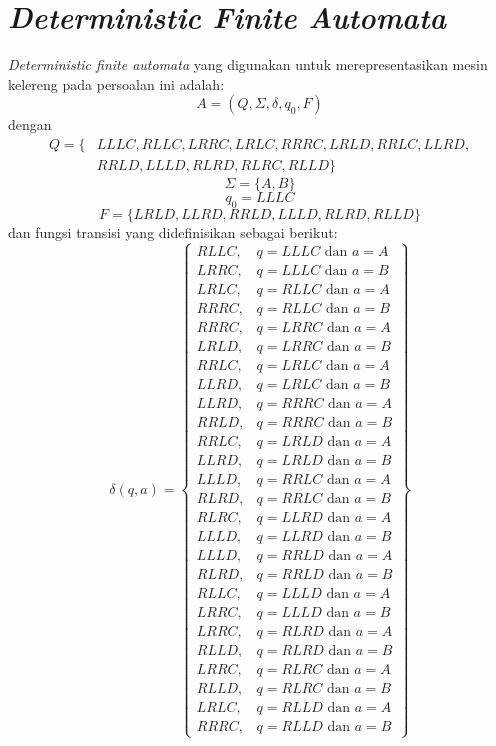 \documentclass[a4paper,titlepage]{article}
\begin{document}
	\section{\textit{Deterministic Finite Automata}}

		\textit{Deterministic finite automata} yang digunakan untuk merepresentasikan mesin kelereng pada persoalan ini adalah:
		\[A = (Q, \Sigma, \delta, q_0, F)\]
		dengan
		\begin{equation*}
			\begin{split}
				Q = \{ & LLLC, RLLC, LRRC, LRLC, RRRC, LRLD, RRLC, LLRD, \\
					& RRLD, LLLD, RLRD, RLRC, RLLD\}
			\end{split}
		\end{equation*}
		\[\Sigma = \{A, B\}\]
		\[q_0 = LLLC\]
		\[F = \{LRLD, LLRD, RRLD, LLLD, RLRD, RLLD\}\]
		dan fungsi transisi yang didefinisikan sebagai berikut:
		\[
			\delta(q, a) = \left\{
				\begin{array}{lr}
					RLLC, & q = LLLC \text{ dan } a = A\\
					LRRC, & q = LLLC \text{ dan } a = B\\
					LRLC, & q = RLLC \text{ dan } a = A\\
					RRRC, & q = RLLC \text{ dan } a = B\\
					RRRC, & q = LRRC \text{ dan } a = A\\
					LRLD, & q = LRRC \text{ dan } a = B\\
					RRLC, & q = LRLC \text{ dan } a = A\\
					LLRD, & q = LRLC \text{ dan } a = B\\
					LLRD, & q = RRRC \text{ dan } a = A\\
					RRLD, & q = RRRC \text{ dan } a = B\\
					RRLC, & q = LRLD \text{ dan } a = A\\
					LLRD, & q = LRLD \text{ dan } a = B\\
					LLLD, & q = RRLC \text{ dan } a = A\\
					RLRD, & q = RRLC \text{ dan } a = B\\
					RLRC, & q = LLRD \text{ dan } a = A\\
					LLLD, & q = LLRD \text{ dan } a = B\\
					LLLD, & q = RRLD \text{ dan } a = A\\
					RLRD, & q = RRLD \text{ dan } a = B\\
					RLLC, & q = LLLD \text{ dan } a = A\\
					LRRC, & q = LLLD \text{ dan } a = B\\
					LRRC, & q = RLRD \text{ dan } a = A\\
					RLLD, & q = RLRD \text{ dan } a = B\\
					LRRC, & q = RLRC \text{ dan } a = A\\
					RLLD, & q = RLRC \text{ dan } a = B\\
					LRLC, & q = RLLD \text{ dan } a = A\\
					RRRC, & q = RLLD \text{ dan } a = B
				\end{array}
			\right\}
		\]
\end{document}
